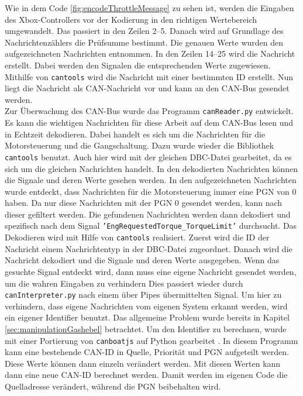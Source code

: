 Wie in dem Code \ref{fig:encodeThrottleMessage} zu sehen ist, werden die Eingaben des Xbox-Controllers vor der Kodierung in den richtigen Wertebereich umgewandelt.
Das passiert in den Zeilen 2--5. Danach wird auf Grundlage des Nachrichtenzählers die Prüfsumme bestimmt. Die genauen Werte wurden 
den aufgezeichneten Nachrichten entnommen. In den Zeilen 14--25 wird die Nachricht erstellt. Dabei werden den Signalen die entsprechenden
Werte zugewiesen. Mithilfe von \texttt{cantools} wird die Nachricht mit einer bestimmten ID erstellt. Nun liegt die Nachricht als
CAN-Nachricht vor und kann an den CAN-Bus gesendet werden.
\\
Zur Überwachung des CAN-Bus wurde das Programm \texttt{canReader.py} entwickelt. Es kann die wichtigen Nachrichten für diese Arbeit 
auf dem CAN-Bus lesen und in Echtzeit dekodieren. Dabei handelt es sich um die Nachrichten für die Motorsteuerung und die Gangschaltung.
Dazu wurde wieder die Bibliothek \texttt{cantools} benutzt. Auch hier wird
mit der gleichen DBC-Datei gearbeitet, da es sich um die gleichen Nachrichten handelt. In den dekodierten Nachrichten
können die Signale und deren Werte gesehen werden. 
In den aufgezeichneten Nachrichten wurde entdeckt, dass Nachrichten für die Motorsteuerung
immer eine PGN von 0 haben. Da nur diese Nachrichten
mit der PGN 0 gesendet werden, kann nach dieser gefiltert werden. Die gefundenen Nachrichten werden dann dekodiert und
spezifisch nach
dem Signal \texttt{'EngRequestedTorque\_TorqueLimit'} durchsucht. 
Das Dekodieren wird mit Hilfe von \texttt{cantools} realisiert. Zuerst wird die ID der Nachricht einem Nachrichtentyp in der DBC-Datei
zugeordnet. Danach wird die Nachricht dekodiert und die Signale und deren Werte ausgegeben.
Wenn das gesuchte Signal entdeckt wird, dann muss eine eigene Nachricht
gesendet werden, um die wahren Eingaben zu verhindern
Dies passiert wieder durch \texttt{canInterpreter.py} nach 
einem über Pipes übermittelten Signal. Um hier zu verhindern, dass eigene Nachrichten vom eigenen System erkannt werden,
wird ein eigener Identifier benutzt. Das allgemeine Problem wurde bereits in Kapitel \ref{sec:manipulationGashebel}
betrachtet.
Um den Identifier zu berechnen, wurde mit einer Portierung von \texttt{canboatjs} auf Python gearbeitet 
\cite{canboatjs}. 
In diesem Programm kann eine bestehende CAN-ID in Quelle, Priorität und PGN aufgeteilt werden. Diese Werte können dann
einzeln verändert werden. Mit diesen Werten kann dann eine neue CAN-ID berechnet werden. 
Damit werden im eigenen Code die Quelladresse verändert, während die PGN beibehalten wird.
